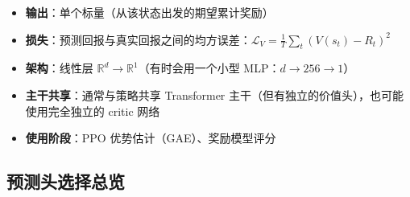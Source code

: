 \begin{keybox}[价值头的特性]
\begin{itemize}
  \item \textbf{输出}：单个标量（从该状态出发的期望累计奖励）
  \item \textbf{损失}：预测回报与真实回报之间的均方误差：$\mathcal{L}_V = \frac{1}{T}\sum_t (V(s_t) - R_t)^2$
  \item \textbf{架构}：线性层 $\mathbb{R}^d \to \mathbb{R}^1$（有时会用一个小型 MLP：$d \to 256 \to 1$）
  \item \textbf{主干共享}：通常与策略共享 Transformer 主干（但有独立的价值头），也可能使用完全独立的 critic 网络
  \item \textbf{使用阶段}：PPO 优势估计（GAE）、奖励模型评分
\end{itemize}
\end{keybox}

\subsection{预测头选择总览}
\label{head-selection-summary}

